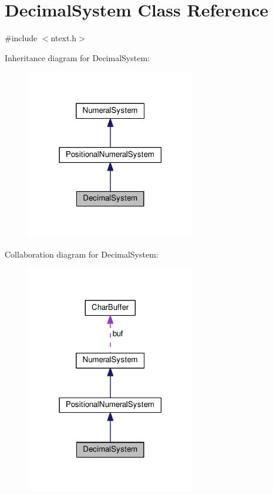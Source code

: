 \hypertarget{classDecimalSystem}{}\section{Decimal\+System Class Reference}
\label{classDecimalSystem}


{\ttfamily \#include $<$ntext.\+h$>$}



Inheritance diagram for Decimal\+System\+:\nopagebreak
\begin{figure}[H]
\begin{center}
\leavevmode
\includegraphics[width=210pt]{classDecimalSystem__inherit__graph}
\end{center}
\end{figure}


Collaboration diagram for Decimal\+System\+:\nopagebreak
\begin{figure}[H]
\begin{center}
\leavevmode
\includegraphics[width=210pt]{classDecimalSystem__coll__graph}
\end{center}
\end{figure}
